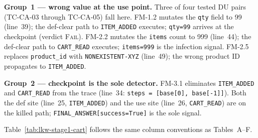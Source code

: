 \documentclass[sigconf,review,anonymous,balance=false]{acmart}
\begin{document}
\textbf{Group~1 --- wrong value at the use point.}
Three of four tested DU pairs (TC-CA-03 through TC-CA-05) fall here.
FM-1.2 mutates the \texttt{qty} field to 99 (line~39); the def-clear path
to \texttt{ITEM\_ADDED} executes; \texttt{qty=99} arrives at the checkpoint
(verdict \textsc{Fail}).
FM-2.2 mutates the \texttt{items} count to 999 (line~44); the def-clear path
to \texttt{CART\_READ} executes; \texttt{items=999} is the infection signal.
FM-2.5 replaces \texttt{product\_id} with \texttt{NONEXISTENT-XYZ} (line~49);
the wrong product ID propagates to \texttt{ITEM\_ADDED}.

\textbf{Group~2 --- checkpoint is the sole detector.}
FM-3.1 eliminates \texttt{ITEM\_ADDED} and \texttt{CART\_READ} from the trace
(line~34: \texttt{steps = [base[0], base[-1]]}).
Both the def site (line~25, \texttt{ITEM\_ADDED}) and the use site
(line~26, \texttt{CART\_READ}) are on the killed path;
\texttt{FINAL\_ANSWER[success=True]} is the sole signal.

Table~\ref{tab:lkw-stage1-cart} follows the same column conventions as
Tables~A--F.
\end{document}
